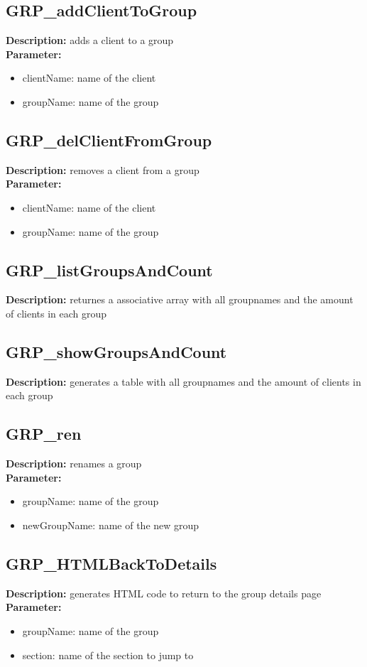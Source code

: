 \subsection{GRP\_addClientToGroup}
\textbf{Description:} adds a client to a group\\
\textbf{Parameter:}
\begin{itemize}
\item clientName: name of the client 
\item groupName: name of the group
\end{itemize}

\subsection{GRP\_delClientFromGroup}
\textbf{Description:} removes a client from a group\\
\textbf{Parameter:}
\begin{itemize}
\item clientName: name of the client 
\item groupName: name of the group
\end{itemize}

\subsection{GRP\_listGroupsAndCount}
\textbf{Description:} returnes a associative array with all groupnames and the amount of clients in each group\\

\subsection{GRP\_showGroupsAndCount}
\textbf{Description:} generates a table with all groupnames and the amount of clients in each group\\

\subsection{GRP\_ren}
\textbf{Description:} renames a group\\
\textbf{Parameter:}
\begin{itemize}
\item groupName: name of the group
\item newGroupName: name of the new group
\end{itemize}

\subsection{GRP\_HTMLBackToDetails}
\textbf{Description:} generates HTML code to return to the group details page\\
\textbf{Parameter:}
\begin{itemize}
\item groupName: name of the group
\item section: name of the section to jump to
\end{itemize}

